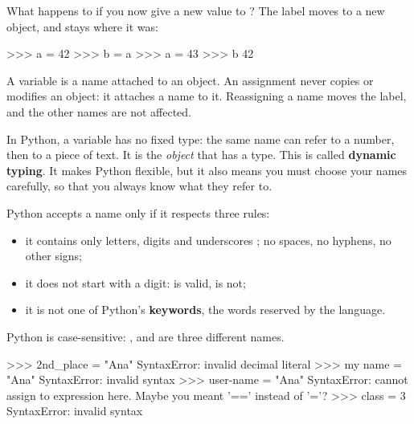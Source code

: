 What happens to  if you now give a new value to ? The label  moves to a new object,
and  stays where it was:

\begin{console}
>>> a = 42
>>> b = a
>>> a = 43
>>> b
42
\end{console}

\begin{memoire}[after \py{a = 43}]
\end{memoire}

\begin{regle}
A variable is a name attached to an object. An assignment never copies or modifies an object: it
attaches a name to it. Reassigning a name moves the label, and the other names are not affected.
\end{regle}

\begin{culture}
In Python, a variable has no fixed type: the same name can refer to a number, then to a piece of
text. It is the \emph{object} that has a type. This is called \textbf{dynamic typing}. It makes
Python flexible, but it also means you must choose your names carefully, so that you always know what
they refer to.
\end{culture}


Python accepts a name only if it respects three rules:
\begin{itemize}
\item it contains only letters, digits and underscores \py{\_}; no spaces, no hyphens, no other
  signs;
\item it does not start with a digit:  is valid,  is not;
\item it is not one of Python's \textbf{keywords}, the words reserved by the language.
\end{itemize}
Python is case-sensitive: ,  and  are three different names.

\begin{console}
>>> 2nd_place = "Ana"
SyntaxError: invalid decimal literal
>>> my name = "Ana"
SyntaxError: invalid syntax
>>> user-name = "Ana"
SyntaxError: cannot assign to expression here. Maybe you meant '==' instead of '='?
>>> class = 3
SyntaxError: invalid syntax
\end{console}

